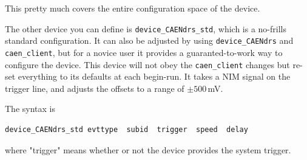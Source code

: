 \documentclass{article}[11pt]
\begin{document}
This pretty much covers the entire configuration space of the device.

The other device you can define is \verb|device_CAENdrs_std|, which is
a no-frills standard configuration. It can also be adjusted by using
\verb|device_CAENdrs| and \verb|caen_client|, but for a novice user it
provides a guaranted-to-work way to configure the device. This device
will not obey the \verb|caen_client| changes but re-set everything to
its defaults at each begin-run. It takes a NIM signal on the
trigger line, and adjusts the offsets to a range of $\pm 500$\,mV.

The syntax is 

\begin{verbatim}
device_CAENdrs_std evttype  subid  trigger  speed  delay
\end{verbatim}

where "trigger" means whether or not the device provides the system trigger. 
\end{document}
